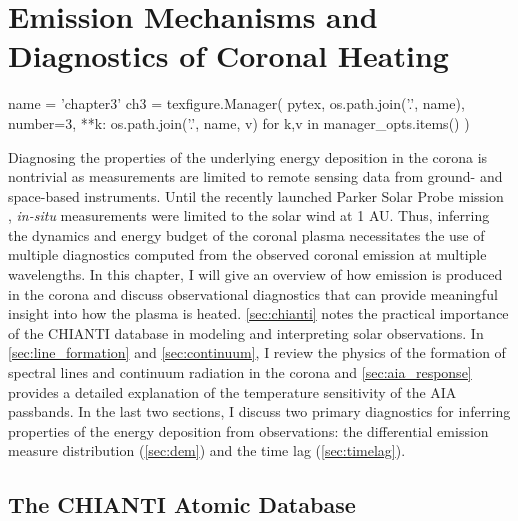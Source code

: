\chapter{Emission Mechanisms and Diagnostics of Coronal Heating}\label{ch:diagnostics}

\begin{pycode}[chapter3]
name = 'chapter3'
ch3 = texfigure.Manager(
    pytex,
    os.path.join('.', name),
    number=3,
    **{k: os.path.join('.', name, v) for k,v in manager_opts.items()}
)
\end{pycode}

Diagnosing the properties of the underlying energy deposition in the corona is nontrivial as measurements are limited to remote sensing data from ground- and space-based instruments. Until the recently launched Parker Solar Probe mission \citep{fox_solar_2016-1}, \textit{in-situ} measurements were limited to the solar wind at 1 AU. Thus, inferring the dynamics and energy budget of the coronal plasma necessitates the use of multiple diagnostics computed from the observed coronal emission at multiple wavelengths. In this chapter, I will give an overview of how emission is produced in the corona and discuss observational diagnostics that can provide meaningful insight into how the plasma is heated. \autoref{sec:chianti} notes the practical importance of the CHIANTI database in modeling and interpreting solar observations. In \autoref{sec:line_formation} and \autoref{sec:continuum}, I review the physics of the formation of spectral lines and continuum radiation in the corona and \autoref{sec:aia_response} provides a detailed explanation of the temperature sensitivity of the AIA passbands. In the last two sections, I discuss two primary diagnostics for inferring properties of the energy deposition from observations: the differential emission measure distribution (\autoref{sec:dem}) and the time lag (\autoref{sec:timelag}).

\section{The CHIANTI Atomic Database}\label{sec:chianti}

